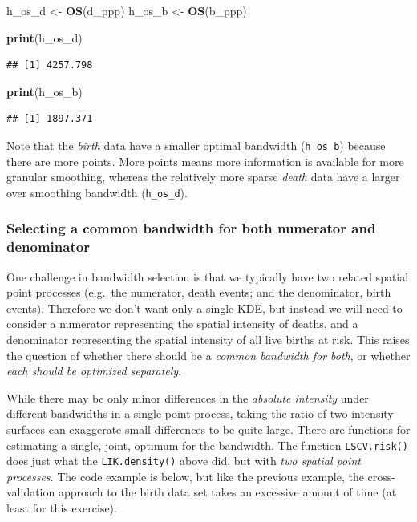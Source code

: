 \documentclass[
]{book}
\newenvironment{Shaded}{\begin{snugshade}}{\end{snugshade}}
\newcommand{\FunctionTok}[1]{\textcolor[rgb]{0.13,0.29,0.53}{\textbf{#1}}}
\newcommand{\NormalTok}[1]{#1}
\newcommand{\OtherTok}[1]{\textcolor[rgb]{0.56,0.35,0.01}{#1}}
\begin{document}
\begin{Shaded}
\begin{Highlighting}[]
\NormalTok{h\_os\_d }\OtherTok{\textless{}{-}} \FunctionTok{OS}\NormalTok{(d\_ppp)}
\NormalTok{h\_os\_b }\OtherTok{\textless{}{-}} \FunctionTok{OS}\NormalTok{(b\_ppp)}

\FunctionTok{print}\NormalTok{(h\_os\_d)}
\end{Highlighting}
\end{Shaded}

\begin{verbatim}
## [1] 4257.798
\end{verbatim}

\begin{Shaded}
\begin{Highlighting}[]
\FunctionTok{print}\NormalTok{(h\_os\_b)}
\end{Highlighting}
\end{Shaded}

\begin{verbatim}
## [1] 1897.371
\end{verbatim}

Note that the \emph{birth} data have a smaller optimal bandwidth (\texttt{h\_os\_b}) because there are more points. More points means more information is available for more granular smoothing, whereas the relatively more sparse \emph{death} data have a larger over smoothing bandwidth (\texttt{h\_os\_d}).

\hypertarget{selecting-a-common-bandwidth-for-both-numerator-and-denominator}{%
\subsubsection{Selecting a common bandwidth for both numerator and denominator}\label{selecting-a-common-bandwidth-for-both-numerator-and-denominator}}

One challenge in bandwidth selection is that we typically have two related spatial point processes (e.g.~the numerator, death events; and the denominator, birth events). Therefore we don't want only a single KDE, but instead we will need to consider a numerator representing the spatial intensity of deaths, and a denominator representing the spatial intensity of all live births at risk. This raises the question of whether there should be a \emph{common bandwidth for both}, or whether \emph{each should be optimized separately}.

While there may be only minor differences in the \emph{absolute intensity} under different bandwidths in a single point process, taking the ratio of two intensity surfaces can exaggerate small differences to be quite large. There are functions for estimating a single, joint, optimum for the bandwidth. The function \texttt{LSCV.risk()} does just what the \texttt{LIK.density()} above did, but with \emph{two spatial point processes}. The code example is below, but like the previous example, the cross-validation approach to the birth data set takes an excessive amount of time (at least for this exercise).
\end{document}
